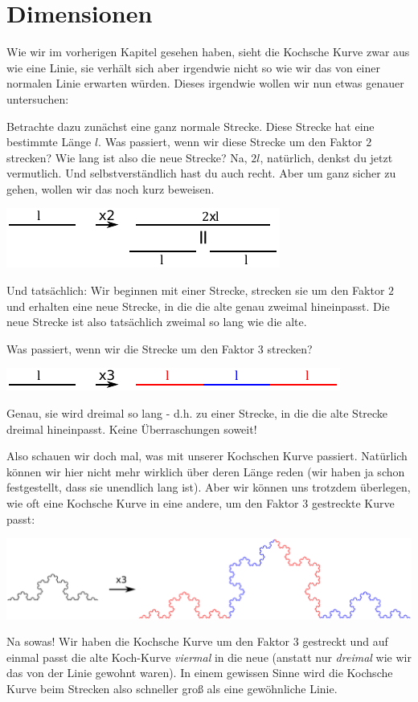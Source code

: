 \documentclass[a4paper,ngerman,12pt]{scrartcl}
\theoremstyle{definition}
\theoremstyle{plain}
\theoremstyle{remark}
\begin{document}
\section{Dimensionen}

Wie wir im vorherigen Kapitel gesehen haben, sieht die Kochsche Kurve zwar aus wie eine Linie, sie verhält sich aber irgendwie nicht so wie wir das von einer normalen Linie erwarten würden. Dieses \glqq irgendwie\grqq{} wollen wir nun etwas genauer untersuchen:

Betrachte dazu zunächst eine ganz normale Strecke. Diese Strecke hat eine bestimmte Länge $l$. Was passiert, wenn wir diese Strecke um den Faktor $2$ strecken? Wie lang ist also die neue Strecke? Na, $2l$, natürlich, denkst du jetzt vermutlich. Und selbstverständlich hast du auch recht. Aber um ganz sicher zu gehen, wollen wir das noch kurz beweisen.

\begin{center}
	\includegraphics[width=.6\textwidth]{Bilder/Linie_vergroessern.pdf}
\end{center}

Und tatsächlich: Wir beginnen mit einer Strecke, strecken sie um den Faktor $2$ und erhalten eine neue Strecke, in die die alte genau zweimal hineinpasst. Die neue Strecke ist also tatsächlich zweimal so lang wie die alte.

Was passiert, wenn wir die Strecke um den Faktor $3$ strecken?
\begin{center}
	\includegraphics[width=.7\textwidth]{Bilder/Linie_vergroessern2.pdf}
\end{center}
Genau, sie wird dreimal so lang - d.h. zu einer Strecke, in die die alte Strecke dreimal hineinpasst. Keine Überraschungen soweit!

Also schauen wir doch mal, was mit unserer Kochschen Kurve passiert. Natürlich können wir hier nicht mehr wirklich über deren Länge reden (wir haben ja schon festgestellt, dass sie unendlich lang ist). Aber wir können uns trotzdem überlegen, wie oft eine Kochsche Kurve in eine andere, um den Faktor $3$ gestreckte Kurve passt:
\begin{center}
	\includegraphics[width=.7\textwidth]{Bilder/KochKurve_vergroessern.pdf}
\end{center}
Na sowas! Wir haben die Kochsche Kurve um den Faktor $3$ gestreckt und auf einmal passt die alte Koch-Kurve \emph{viermal} in die neue (anstatt nur \emph{dreimal} wie wir das von der Linie gewohnt waren). In einem gewissen Sinne wird die Kochsche Kurve beim Strecken also \glqq schneller groß\grqq{} als eine gewöhnliche Linie.
\end{document}
